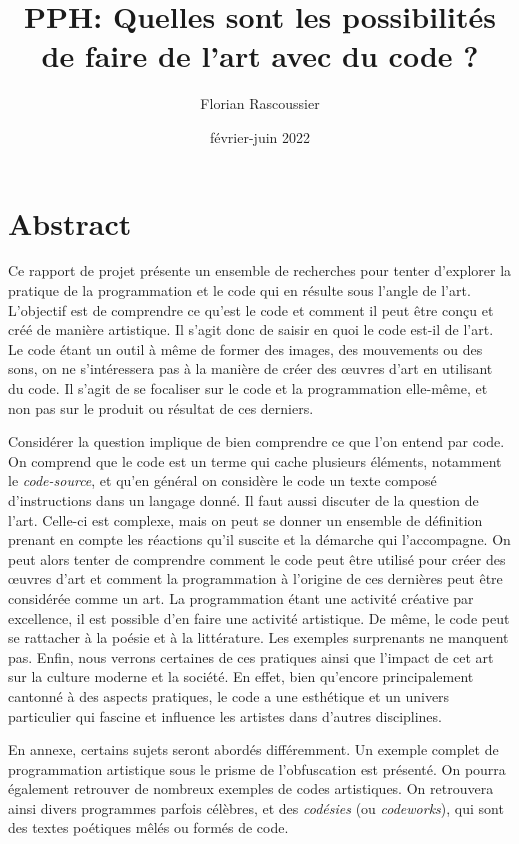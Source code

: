 \documentclass[12pt]{article} %
\title{PPH: Quelles sont les possibilités de faire de l'art avec du code ?}
\author{Florian Rascoussier}
\date{février-juin 2022}
\begin{document}

\newpage


\newpage

\section*{Abstract}
Ce rapport de projet présente un ensemble de recherches pour tenter d'explorer la pratique de la programmation et le code qui en résulte sous l'angle de l'art. L'objectif est de comprendre ce qu'est le code et comment il peut être conçu et créé de manière artistique. Il s'agit donc de saisir en quoi le code est-il de l'art. Le code étant un outil à même de former des images, des mouvements ou des sons, on ne s'intéressera pas à la manière de créer des œuvres d'art en utilisant du code. Il s'agit de se focaliser sur le code et la programmation elle-même, et non pas sur le produit ou résultat de ces derniers.

Considérer la question implique de bien comprendre ce que l'on entend par code. On comprend que le code est un terme qui cache plusieurs éléments, notamment le \textit{code-source}, et qu'en général on considère le code un texte composé d'instructions dans un langage donné. Il faut aussi discuter de la question de l'art. Celle-ci est complexe, mais on peut se donner un ensemble de définition prenant en compte les réactions qu'il suscite et la démarche qui l'accompagne. On peut alors tenter de comprendre comment le code peut être utilisé pour créer des œuvres d'art et comment la programmation à l'origine de ces dernières peut être considérée comme un art. La programmation étant une activité créative par excellence, il est possible d'en faire une activité artistique. De même, le code peut se rattacher à la poésie et à la littérature. Les exemples surprenants ne manquent pas. Enfin, nous verrons certaines de ces pratiques ainsi que l'impact de cet art sur la culture moderne et la société. En effet, bien qu'encore principalement cantonné à des aspects pratiques, le code a une esthétique et un univers particulier qui fascine et influence les artistes dans d'autres disciplines. 

En annexe, certains sujets seront abordés différemment. Un exemple complet de programmation artistique sous le prisme de l'obfuscation est présenté. On pourra également retrouver de nombreux exemples de codes artistiques. On retrouvera ainsi divers programmes parfois célèbres, et des \textit{codésies} (ou \textit{codeworks}), qui sont des textes poétiques mêlés ou formés de code.
\end{document}
